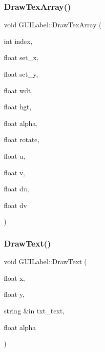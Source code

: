 \subsubsection{\texorpdfstring{Draw\+Tex\+Array()}{DrawTexArray()}\hspace{0.1cm}{\footnotesize\ttfamily [2/2]}}
{\footnotesize\ttfamily void G\+U\+I\+Label\+::\+Draw\+Tex\+Array (\begin{DoxyParamCaption}\item[{int}]{index,  }\item[{float}]{set\+\_\+x,  }\item[{float}]{set\+\_\+y,  }\item[{float}]{wdt,  }\item[{float}]{hgt,  }\item[{float}]{alpha,  }\item[{float}]{rotate,  }\item[{float}]{u,  }\item[{float}]{v,  }\item[{float}]{du,  }\item[{float}]{dv }\end{DoxyParamCaption})}

\hypertarget{class_g_u_i_label_a00fc5b5e6000000dd1a8b8c45a63f018}{}\label{class_g_u_i_label_a00fc5b5e6000000dd1a8b8c45a63f018} 
\subsubsection{\texorpdfstring{Draw\+Text()}{DrawText()}\hspace{0.1cm}{\footnotesize\ttfamily [1/3]}}
{\footnotesize\ttfamily void G\+U\+I\+Label\+::\+Draw\+Text (\begin{DoxyParamCaption}\item[{float}]{x,  }\item[{float}]{y,  }\item[{string \&in}]{txt\+\_\+text,  }\item[{float}]{alpha }\end{DoxyParamCaption})}

\hypertarget{class_g_u_i_label_aa26b1fae9188de6084e94124ad6a15dd}{}\label{class_g_u_i_label_aa26b1fae9188de6084e94124ad6a15dd} 
